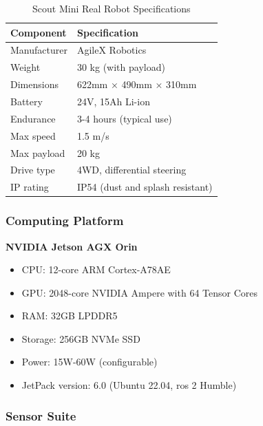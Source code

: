 \begin{table}[h]
\centering
\caption{Scout Mini Real Robot Specifications}
\label{tab:scout_mini_specs}
\begin{tabular}{ll}
\toprule
\textbf{Component} & \textbf{Specification} \\
\midrule
Manufacturer & AgileX Robotics \\
Weight & 30 kg (with payload) \\
Dimensions & 622mm × 490mm × 310mm \\
Battery & 24V, 15Ah Li-ion \\
Endurance & 3-4 hours (typical use) \\
Max speed & 1.5 m/s \\
Max payload & 20 kg \\
Drive type & 4WD, differential steering \\
IP rating & IP54 (dust and splash resistant) \\
\bottomrule
\end{tabular}
\end{table}

\subsubsection{Computing Platform}

\textbf{NVIDIA Jetson AGX Orin}
\begin{itemize}
    \item CPU: 12-core ARM Cortex-A78AE
    \item GPU: 2048-core NVIDIA Ampere with 64 Tensor Cores
    \item RAM: 32GB LPDDR5
    \item Storage: 256GB NVMe SSD
    \item Power: 15W-60W (configurable)
    \item JetPack version: 6.0 (Ubuntu 22.04, \acrshort{ros} 2 Humble)
\end{itemize}

\subsubsection{Sensor Suite}

